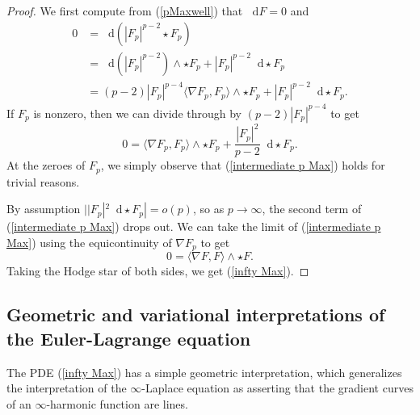 \documentclass[reqno,11pt]{amsart}
\newcommand*\dif{\mathop{}\!\mathrm{d}}
\theoremstyle{definition}
\numberwithin{equation}{section}
\begin{document}
\begin{proof}
We first compute from (\ref{pMaxwell}) that $\dif F = 0$ and
\begin{align*}
0
&= \dif(|F_p|^{p - 2} \star F_p) \\
&= \dif(|F_p|^{p - 2}) \wedge \star F_p + |F_p|^{p - 2} \dif \star F_p \\
&= (p - 2) |F_p|^{p - 4} \langle \nabla F_p, F_p\rangle \wedge \star F_p + |F_p|^{p - 2} \dif \star F_p.
\end{align*}
If $F_p$ is nonzero, then we can divide through by $(p - 2) |F_p|^{p - 4}$ to get
\begin{equation}\label{intermediate p Max}
0 = \langle\nabla F_p, F_p\rangle \wedge \star F_p + \frac{|F_p|^2}{p - 2} \dif \star F_p.
\end{equation}
At the zeroes of $F_p$, we simply observe that (\ref{intermediate p Max}) holds for trivial reasons.

By assumption $||F_p|^2 \dif \star F_p| = o(p)$, so as $p \to \infty$, the second term of (\ref{intermediate p Max}) drops out.
We can take the limit of (\ref{intermediate p Max}) using the equicontinuity of $\nabla F_p$ to get
$$0 = \langle \nabla F, F \rangle \wedge \star F.$$
Taking the Hodge star of both sides, we get (\ref{infty Max}).
\end{proof}

\subsection{Geometric and variational interpretations of the Euler-Lagrange equation}
The PDE (\ref{infty Max}) has a simple geometric interpretation, which generalizes the interpretation of the $\infty$-Laplace equation as asserting that the gradient curves of an $\infty$-harmonic function are lines.
\end{document}
